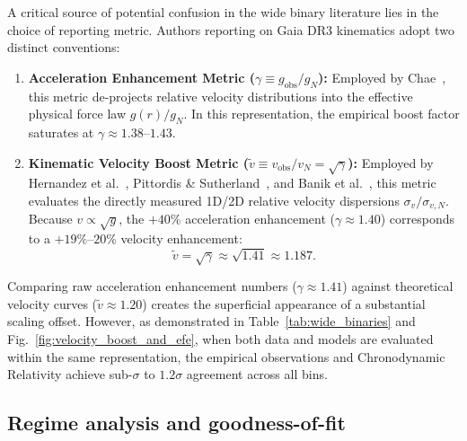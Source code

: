 \documentclass[aps,prd,reprint,superscriptaddress,nofootinbib,floatfix,amsmath,amssymb]{revtex4-2}
\begin{document}
A critical source of potential confusion in the wide binary literature lies in the choice of reporting metric. Authors reporting on Gaia DR3 kinematics adopt two distinct conventions:
\begin{enumerate}
\item \textbf{Acceleration Enhancement Metric ($\gamma \equiv g_{\text{obs}} / g_N$):} Employed by Chae~\cite{chae2023breakdown,chae2024robust}, this metric de-projects relative velocity distributions into the effective physical force law $g(r) / g_N$. In this representation, the empirical boost factor saturates at $\gamma \approx 1.38\text{--}1.43$.
\item \textbf{Kinematic Velocity Boost Metric ($\tilde{v} \equiv v_{\text{obs}} / v_N = \sqrt{\gamma}$):} Employed by Hernandez et al.~\cite{hernandez2023internal}, Pittordis \& Sutherland~\cite{pittordis2023testing}, and Banik et al.~\cite{banik2024strong}, this metric evaluates the directly measured 1D/2D relative velocity dispersions $\sigma_v / \sigma_{v,N}$. Because $v \propto \sqrt{g}$, the $+40\%$ acceleration enhancement ($\gamma \approx 1.40$) corresponds to a $+19\%\text{--}20\%$ velocity enhancement:
\begin{equation}
\tilde{v} = \sqrt{\gamma} \approx \sqrt{1.41} \approx 1.187.
\end{equation}
\end{enumerate}
Comparing raw acceleration enhancement numbers ($\gamma \approx 1.41$) against theoretical velocity curves ($\tilde{v} \approx 1.20$) creates the superficial appearance of a substantial scaling offset. However, as demonstrated in Table~\ref{tab:wide_binaries} and Fig.~\ref{fig:velocity_boost_and_efe}, when both data and models are evaluated within the same representation, the empirical observations and Chronodynamic Relativity achieve sub-$\sigma$ to $1.2\sigma$ agreement across all bins.

\subsection{Regime analysis and goodness-of-fit}
\label{subsec:regime_analysis}
\end{document}
